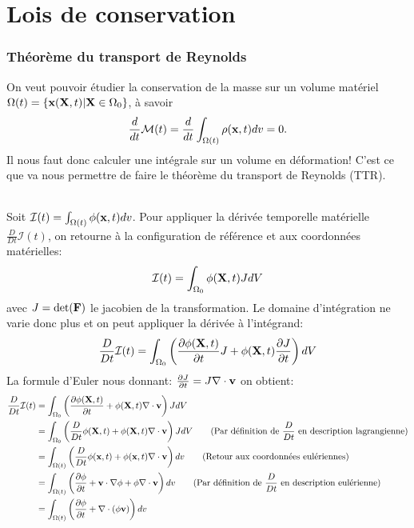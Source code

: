 \part{Lois de conservation}
\section{Théorème du transport de Reynolds}
On veut pouvoir étudier la conservation de la masse sur un volume matériel $\Omega (t)=\{\textbf{x}(\textbf{X},t)|\textbf{X}\in \Omega_0\}$, à savoir $$\frac{d}{dt}\mathcal{M}(t)=\frac{d}{dt}\int_{\Omega (t)}\rho(\textbf{x},t)dv=0.$$ Il nous faut donc calculer une intégrale sur un volume en déformation! C'est ce que va nous permettre de faire le théorème du transport de Reynolds (TTR).
\paragraph{}
Soit $\mathcal{I}(t)=\int_{\Omega (t)}\phi(\textbf{x},t)dv$. Pour appliquer la dérivée temporelle matérielle $\frac{D}{Dt}\mathcal{I}(t)$, on retourne à la configuration de référence et aux coordonnées matérielles:
$$\mathcal{I}(t)=\int_{\Omega_0}\phi(\textbf{X},t)JdV$$ avec $J=\det(\textbf{F})$ le jacobien de la transformation. Le domaine d'intégration ne varie donc plus et on peut appliquer la dérivée à l'intégrand:
$$\frac{D}{Dt}\mathcal{I}(t)=\int_{\Omega_0}\left(\frac{\partial \phi(\textbf{X},t)}{\partial t}J+\phi(\textbf{X},t)\frac{\partial J}{\partial t}\right)dV$$
La formule d'Euler nous donnant: $\frac{\partial J}{\partial t}=J\nabla\cdot\textbf{v}$ on obtient:
$$\begin{aligned}
\frac{D}{Dt}\mathcal{I}(t)&=\int_{\Omega_0}\left(\frac{\partial \phi(\textbf{X},t)}{\partial t}+\phi(\textbf{X},t)\nabla\cdot\textbf{v}\right)JdV\\
 &=\int_{\Omega_0}\left(\frac{D}{Dt}\phi(\textbf{X},t)+\phi(\textbf{X},t)\nabla\cdot\textbf{v}\right)JdV \qquad\text{(Par définition de } \frac{D}{Dt}\text{ en description lagrangienne)}\\
 &=\int_{\Omega (t)}\left(\frac{D}{Dt}\phi(\textbf{x},t)+\phi(\textbf{x},t)\nabla\cdot\textbf{v}\right)dv\qquad\text{(Retour aux coordonnées eulériennes) }\\
 &=\int_{\Omega (t)}\left(\frac{\partial\phi}{\partial t}+\textbf{v}\cdot\nabla\phi+\phi\nabla\cdot\textbf{v}\right)dv\qquad\text{(Par définition de } \frac{D}{Dt}\text{ en description eulérienne)}\\
 &=\int_{\Omega (t)}\left(\frac{\partial\phi}{\partial t}+\nabla\cdot(\phi\textbf{v})\right)dv
\end{aligned}$$
